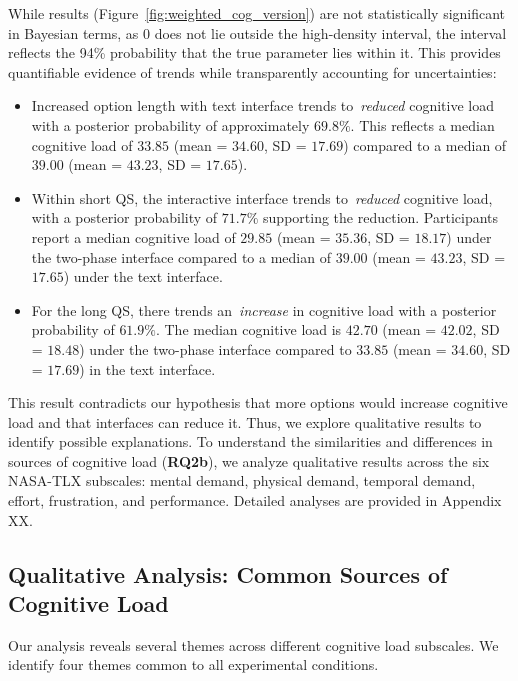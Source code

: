 While results (Figure~\ref{fig:weighted_cog_version}) are not statistically significant in Bayesian terms, as 0 does not lie outside the high-density interval, the interval reflects the 94\% probability that the true parameter lies within it. This provides quantifiable evidence of trends while transparently accounting for uncertainties:
\begin{itemize}
    \item Increased option length with text interface trends to~\textit{reduced} cognitive load with a posterior probability of approximately $69.8\%$. This reflects a median cognitive load of $33.85$ (mean = $34.60$, SD = $17.69$) compared to a median of $39.00$ (mean = $43.23$, SD = $17.65$).
    \item Within short QS, the interactive interface trends to~\textit{reduced} cognitive load, with a posterior probability of $71.7\%$ supporting the reduction. Participants report a median cognitive load of $29.85$ (mean = $35.36$, SD = $18.17$) under the two-phase interface compared to a median of $39.00$ (mean = $43.23$, SD = $17.65$) under the text interface.
    \item For the long QS, there trends an~\textit{increase} in cognitive load with a posterior probability of $61.9\%$. The median cognitive load is $42.70$ (mean = $42.02$, SD = $18.48$) under the two-phase interface compared to $33.85$ (mean = $34.60$, SD = $17.69$) in the text interface.
\end{itemize}

This result contradicts our hypothesis that more options would increase cognitive load and that interfaces can reduce it. Thus, we explore qualitative results to identify possible explanations. To understand the similarities and differences in sources of cognitive load (\textbf{RQ2b}), we analyze qualitative results across the six NASA-TLX subscales: mental demand, physical demand, temporal demand, effort, frustration, and performance. Detailed analyses are provided in Appendix XX.

\subsection{Qualitative Analysis: Common Sources of Cognitive Load}
\label{sec:cog_common}
Our analysis reveals several themes across different cognitive load subscales. We identify four themes common to all experimental conditions.

